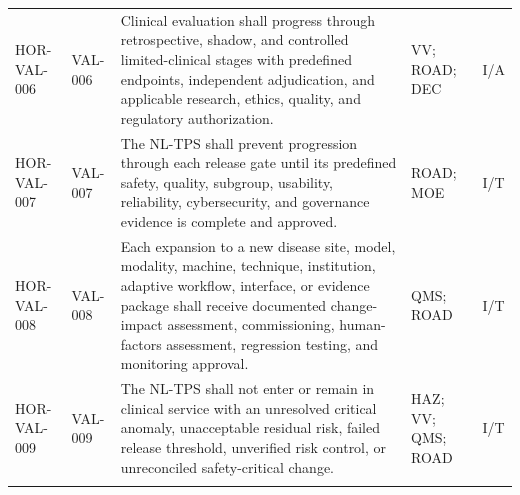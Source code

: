 \documentclass[11pt,letterpaper]{article}
\begin{document}
\begin{scriptsize}
\begin{longtable}{@{}L{0.14\textwidth}L{0.09\textwidth}L{0.47\textwidth}L{0.15\textwidth}L{0.07\textwidth}@{}}
\addlinespace[2pt]
\mbox{HOR-VAL-006} & \mbox{VAL-006} & Clinical evaluation shall progress through retrospective, shadow, and controlled limited-clinical stages with predefined endpoints, independent adjudication, and applicable research, ethics, quality, and regulatory authorization. & VV; ROAD; DEC & I\slash\allowbreak{}A \\
\addlinespace[2pt]
\mbox{HOR-VAL-007} & \mbox{VAL-007} & The NL-TPS shall prevent progression through each release gate until its predefined safety, quality, subgroup, usability, reliability, cybersecurity, and governance evidence is complete and approved. & ROAD; MOE & I\slash\allowbreak{}T \\
\addlinespace[2pt]
\mbox{HOR-VAL-008} & \mbox{VAL-008} & Each expansion to a new disease site, model, modality, machine, technique, institution, adaptive workflow, interface, or evidence package shall receive documented change-impact assessment, commissioning, human-factors assessment, regression testing, and monitoring approval. & QMS; ROAD & I\slash\allowbreak{}T \\
\addlinespace[2pt]
\mbox{HOR-VAL-009} & \mbox{VAL-009} & The NL-TPS shall not enter or remain in clinical service with an unresolved critical anomaly, unacceptable residual risk, failed release threshold, unverified risk control, or unreconciled safety-critical change. & HAZ; VV; QMS; ROAD & I\slash\allowbreak{}T \\
\addlinespace[2pt]
\end{longtable}
\end{scriptsize}
\end{document}
